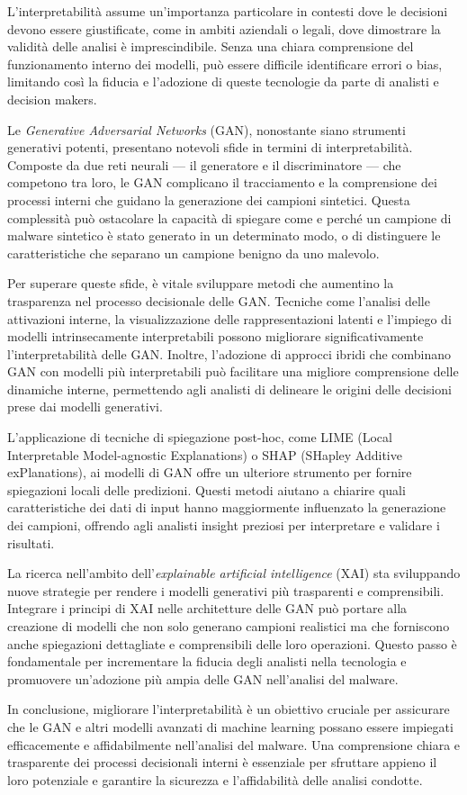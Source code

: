 L'interpretabilità assume un'importanza particolare in contesti dove le decisioni devono essere giustificate, come in ambiti aziendali o legali, dove dimostrare la validità delle analisi è imprescindibile. Senza una chiara comprensione del funzionamento interno dei modelli, può essere difficile identificare errori o bias, limitando così la fiducia e l'adozione di queste tecnologie da parte di analisti e decision makers.

Le \emph{Generative Adversarial Networks} (GAN), nonostante siano strumenti generativi potenti, presentano notevoli sfide in termini di interpretabilità. Composte da due reti neurali — il generatore e il discriminatore — che competono tra loro, le GAN complicano il tracciamento e la comprensione dei processi interni che guidano la generazione dei campioni sintetici. Questa complessità può ostacolare la capacità di spiegare come e perché un campione di malware sintetico è stato generato in un determinato modo, o di distinguere le caratteristiche che separano un campione benigno da uno malevolo.

Per superare queste sfide, è vitale sviluppare metodi che aumentino la trasparenza nel processo decisionale delle GAN. Tecniche come l'analisi delle attivazioni interne, la visualizzazione delle rappresentazioni latenti e l'impiego di modelli intrinsecamente interpretabili possono migliorare significativamente l'interpretabilità delle GAN. Inoltre, l'adozione di approcci ibridi che combinano GAN con modelli più interpretabili può facilitare una migliore comprensione delle dinamiche interne, permettendo agli analisti di delineare le origini delle decisioni prese dai modelli generativi.

L'applicazione di tecniche di spiegazione post-hoc, come LIME (Local Interpretable Model-agnostic Explanations) o SHAP (SHapley Additive exPlanations), ai modelli di GAN offre un ulteriore strumento per fornire spiegazioni locali delle predizioni. Questi metodi aiutano a chiarire quali caratteristiche dei dati di input hanno maggiormente influenzato la generazione dei campioni, offrendo agli analisti insight preziosi per interpretare e validare i risultati.

La ricerca nell'ambito dell'\emph{explainable artificial intelligence} (XAI) sta sviluppando nuove strategie per rendere i modelli generativi più trasparenti e comprensibili. Integrare i principi di XAI nelle architetture delle GAN può portare alla creazione di modelli che non solo generano campioni realistici ma che forniscono anche spiegazioni dettagliate e comprensibili delle loro operazioni. Questo passo è fondamentale per incrementare la fiducia degli analisti nella tecnologia e promuovere un'adozione più ampia delle GAN nell'analisi del malware.

In conclusione, migliorare l'interpretabilità è un obiettivo cruciale per assicurare che le GAN e altri modelli avanzati di machine learning possano essere impiegati efficacemente e affidabilmente nell'analisi del malware. Una comprensione chiara e trasparente dei processi decisionali interni è essenziale per sfruttare appieno il loro potenziale e garantire la sicurezza e l'affidabilità delle analisi condotte.


